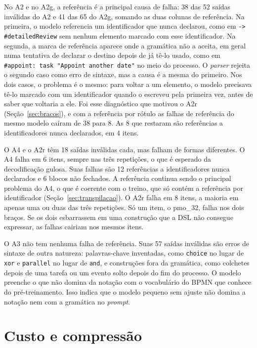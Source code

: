 No A2 e no A2g, a referência é a principal causa de falha: 38 das 52 saídas inválidas do A2 e 41 das 65 do A2g, somando as duas colunas de referência. Na primeira, o modelo referencia um identificador que nunca declarou, como em \verb|-> #detailedReview| sem nenhum elemento marcado com esse identificador. Na segunda, a marca de referência aparece onde a gramática não a aceita, em geral numa tentativa de declarar o destino depois de já tê-lo usado, como em \verb|#appoint: task "Appoint another date"| no meio do processo. O \textit{parser} rejeita o segundo caso como erro de sintaxe, mas a causa é a mesma do primeiro. Nos dois casos, o problema é o mesmo: para voltar a um elemento, o modelo precisava tê-lo marcado com um identificador quando o escreveu pela primeira vez, antes de saber que voltaria a ele. Foi esse diagnóstico que motivou o A2r (Seção~\ref{sec:bracos}), e com a referência por rótulo as falhas de referência do mesmo modelo caíram de 38 para 8. As 8 que restaram são referências a identificadores nunca declarados, em 4 itens.

O A4 e o A2r têm 18 saídas inválidas cada, mas falham de formas diferentes. O A4 falha em 6 itens, sempre nas três repetições, o que é esperado da decodificação gulosa. Suas falhas são 12 referências a identificadores nunca declarados e 6 blocos não fechados. A referência continua sendo o principal problema do A4, o que é coerente com o treino, que só contém a referência por identificador (Seção~\ref{sec:transpilacao}). O A2r falha em 8 itens, a maioria em apenas uma ou duas das três repetições. Só um item, o pmo\_32, falha nos dois braços. Se os dois esbarrassem em uma construção que a DSL não consegue expressar, as falhas cairiam nos mesmos itens.

O A3 não tem nenhuma falha de referência. Suas 57 saídas inválidas são erros de sintaxe de outra natureza: palavras-chave inventadas, como \texttt{choice} no lugar de \texttt{xor} e \texttt{parallel} no lugar de \texttt{and}, e construções fora da gramática, como colchetes depois de uma tarefa ou um evento solto depois do fim do processo. O modelo preenche o que não domina da notação com o vocabulário do BPMN que conhece do pré-treinamento. Isso indica que o modelo pequeno sem ajuste não domina a notação nem com a gramática no \textit{prompt}.

\section{Custo e compressão}\label{sec:res-custo}\label{sec:res-compressao}

